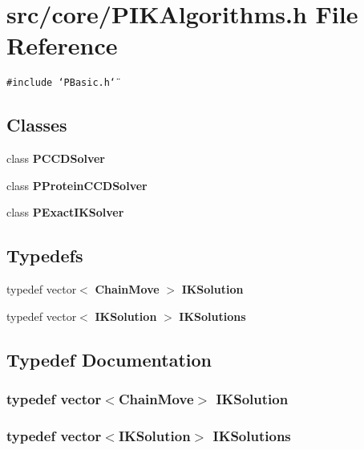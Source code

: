 \section{src/core/PIKAlgorithms.h File Reference}
\label{PIKAlgorithms_8h}


{\tt \#include \char`\"{}PBasic.h\char`\"{}}\par
\subsection*{Classes}
\begin{CompactItemize}
\item 
class {\bf PCCDSolver}
\item 
class {\bf PProtein\-CCDSolver}
\item 
class {\bf PExact\-IKSolver}
\end{CompactItemize}
\subsection*{Typedefs}
\begin{CompactItemize}
\item 
typedef vector$<$ {\bf Chain\-Move} $>$ {\bf IKSolution}
\item 
typedef vector$<$ {\bf IKSolution} $>$ {\bf IKSolutions}
\end{CompactItemize}


\subsection{Typedef Documentation}
\subsubsection{\setlength{\rightskip}{0pt plus 5cm}typedef vector$<${\bf Chain\-Move}$>$ {\bf IKSolution}}\label{PIKAlgorithms_8h_8212c7b5edba29e8b16320d1721ef959}


\subsubsection{\setlength{\rightskip}{0pt plus 5cm}typedef vector$<${\bf IKSolution}$>$ {\bf IKSolutions}}\label{PIKAlgorithms_8h_a48f820588a20e13ada1079ec9bd7fb9}


